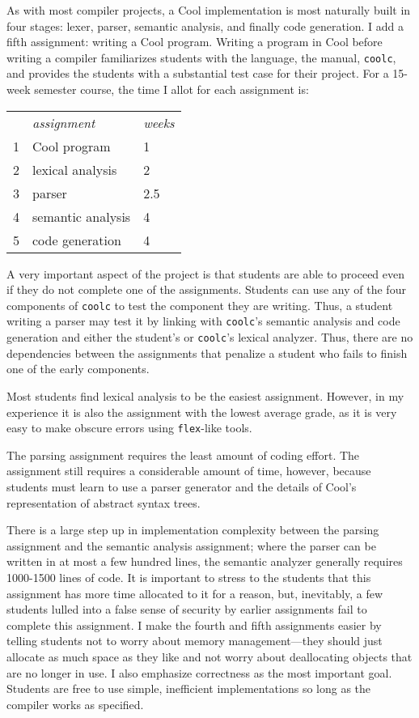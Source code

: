 As with most compiler projects, a Cool implementation is most naturally 
built in four stages: lexer, parser, semantic analysis, and finally
code generation.  I add a fifth assignment: writing a Cool program.
Writing a program in Cool before writing a compiler familiarizes students
with the language, the manual, {\tt coolc}, and provides the students
with a substantial test case for their project.  For a 15-week semester 
course,
the time I allot for each assignment is: \\[.2in]
\begin{tabular}{lll}
 & {\em assignment} & {\em weeks} \\
1 & Cool program & 1 \\
2 & lexical analysis & 2 \\
3 & parser & 2.5 \\
4 & semantic analysis & 4 \\
5 & code generation & 4 \\[.2in]
\end{tabular}

A very important aspect of the project is that students are able to
proceed even if they do not complete one of the assignments.
Students can use any of the four components of {\tt coolc} to test the
component they are writing.  Thus, a student writing a parser may test
it by linking with {\tt coolc}'s semantic analysis and code
generation and either the student's or {\tt coolc}'s lexical
analyzer.  Thus, there are no dependencies between the assignments
that penalize a student who fails to finish one of the early components.

Most students find lexical analysis to be the easiest assignment.
However, in my experience it is also the assignment with the lowest
average grade, as it is very easy to make obscure errors using {\tt flex}-like
tools.

The parsing assignment requires the least amount of coding effort.
The assignment still requires a considerable amount of time, however,
because students must learn to use a parser generator and the details
of Cool's representation of abstract syntax trees.

There is a large step up in implementation complexity between the
parsing assignment and the semantic analysis assignment; where the
parser can be written in at most a few hundred lines, the semantic
analyzer generally requires 1000-1500 lines of code.  It is important
to stress to the students that this assignment has more time allocated
to it for a reason, but, inevitably, a few students lulled into a false
sense of security by earlier assignments fail to complete this
assignment. 
 I make the fourth and fifth assignments easier by telling students
not to worry about memory management---they should just allocate as
much space as they like and not worry about deallocating objects that
are no longer in use.  I also emphasize correctness as the most important
goal.  Students are free to use simple, inefficient implementations
so long as the compiler works as specified.

